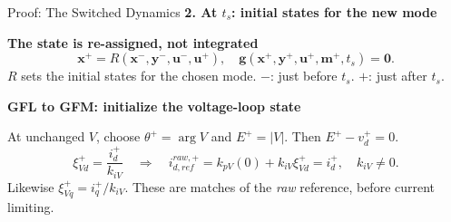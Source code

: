 \documentclass{beamer}
\begin{document}
\begin{frame}{Proof: The Switched Dynamics}
\small
\setlength{\abovedisplayskip}{7pt}
\setlength{\belowdisplayskip}{7pt}
\setlength{\abovedisplayshortskip}{5pt}
\setlength{\belowdisplayshortskip}{5pt}
\vspace*{0.10cm}
{\color{barblue}\textbf{2. At $t_s$: initial states for the new mode}}\par
\vspace{0.26cm}
\textbf{The state is re-assigned, not integrated}
\begin{equation}\label{eq:hybrid-initial-condition}
\bm x^+=R(\bm x^-,\bm y^-,\bm u^-,\bm u^+),
\quad \bm g(\bm x^+,\bm y^+,\bm u^+,\bm m^+,t_s)=\bm0 .
\end{equation}
{\scriptsize $R$ sets the initial states for the chosen mode.
$-$: just before $t_s$. $+$: just after $t_s$.}

\vspace{0.34cm}
\textbf{GFL to GFM: initialize the voltage-loop state}

\vspace{0.06cm}
{\scriptsize At unchanged $V$, choose $\theta^+=\arg V$ and $E^+=|V|$.
Then $E^+-v_d^+=0$.}
\begin{equation}\label{eq:pi-initial-condition}
\xi_{Vd}^+=\frac{i_d^+}{k_{iV}}
\quad\Longrightarrow\quad
i_{d,ref}^{raw,+}=k_{pV}(0)+k_{iV}\xi_{Vd}^+=i_d^+ ,\quad k_{iV}\ne0 .
\end{equation}
\vspace{0.04cm}
{\scriptsize Likewise $\xi_{Vq}^+=i_q^+/k_{iV}$. These are matches of the
\emph{raw} reference, before current limiting.}
\end{frame}
\end{document}
